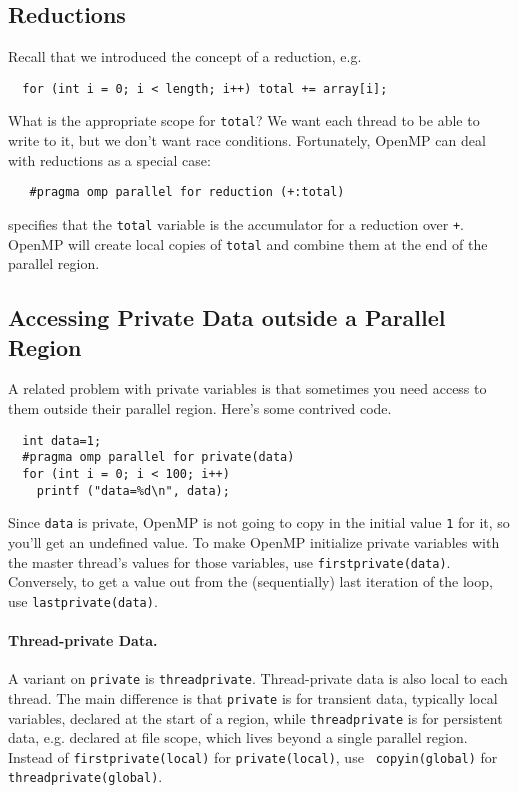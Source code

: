 




\subsection*{Reductions}
Recall that we introduced the concept of a reduction, e.g.
{\small
\begin{verbatim}
  for (int i = 0; i < length; i++) total += array[i];
\end{verbatim}
}
What is the appropriate scope for {\tt total}? We want each thread
to be able to write to it, but we don't want race conditions.
Fortunately, OpenMP can deal with reductions as a special case:

\verb!   #pragma omp parallel for reduction (+:total)!

\noindent
specifies that the {\tt total} variable is the accumulator for a
reduction over {\tt +}. OpenMP will create local copies of {\tt total} and 
combine them at the end of the parallel region.

\subsection*{Accessing Private Data outside a Parallel Region}
A related problem with private variables is that sometimes you need 
access to them outside their parallel region. Here's some contrived code.

{\small
\begin{verbatim}
  int data=1;
  #pragma omp parallel for private(data)
  for (int i = 0; i < 100; i++)
    printf ("data=%d\n", data);
\end{verbatim}
}
Since {\tt data} is private, OpenMP is not going to copy in the
initial value {\tt 1} for it, so you'll get an undefined value.  To
make OpenMP initialize private variables with the master thread's
values for those variables, use {\tt firstprivate(data)}.  Conversely,
to get a value out from the (sequentially) last iteration of the loop,
use {\tt lastprivate(data)}.

\paragraph{Thread-private Data.} A variant on {\tt private} is
{\tt threadprivate}. Thread-private data is also local to each
thread. The main difference is that {\tt private} is for transient
data, typically local variables, declared at the start of a region,
while {\tt threadprivate} is for persistent data, e.g. declared at
file scope, which lives beyond a single parallel region. Instead of
{\tt firstprivate(local)} for {\tt private(local)}, use {\tt
  copyin(global)} for {\tt threadprivate(global)}.

